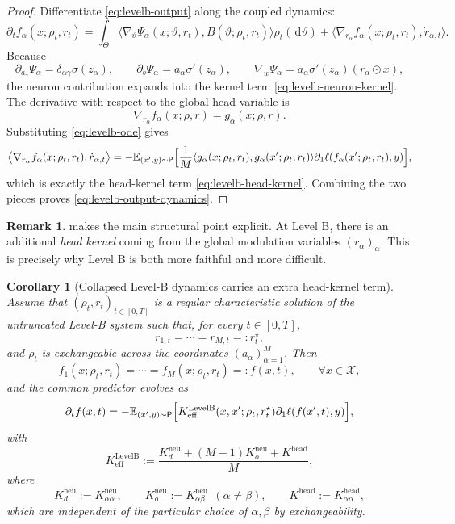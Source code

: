 \documentclass[11pt]{article}
\newtheorem{corollary}[theorem]{Corollary}
\theoremstyle{definition}
\newtheorem{remark}[theorem]{Remark}
\newcommand{\E}{\mathbb{E}}
\newcommand{\dd}{\,\mathrm{d}}
\begin{document}
\begin{proof}
Differentiate \eqref{eq:levelb-output} along the coupled dynamics:
\[
  \partial_t f_\alpha(x;\rho_t,r_t)
  =
  \int_\Theta
  \langle \nabla_\vartheta \Psi_\alpha(x;\vartheta,r_t),
  B(\vartheta;\rho_t,r_t)\rangle
  \rho_t(\dd \vartheta)
  +
  \bigl\langle \nabla_{r_\alpha}f_\alpha(x;\rho_t,r_t),\dot r_{\alpha,t}\bigr\rangle.
\]
Because
\[
  \partial_{a_\gamma}\Psi_\alpha
  =
  \delta_{\alpha\gamma}\sigma(z_\alpha),
  \qquad
  \partial_b\Psi_\alpha
  =
  a_\alpha \sigma'(z_\alpha),
  \qquad
  \nabla_w\Psi_\alpha
  =
  a_\alpha \sigma'(z_\alpha)(r_\alpha\odot x),
\]
the neuron contribution expands into the kernel term \eqref{eq:levelb-neuron-kernel}.
The derivative with respect to the global head variable is
\[
  \nabla_{r_\alpha}f_\alpha(x;\rho,r)=g_\alpha(x;\rho,r).
\]
Substituting \eqref{eq:levelb-ode} gives
\[
  \bigl\langle \nabla_{r_\alpha}f_\alpha(x;\rho_t,r_t),\dot r_{\alpha,t}\bigr\rangle
  =
  -\E_{(x',y)\sim\mathsf P}
  \Bigl[
    \frac1M
    \langle g_\alpha(x;\rho_t,r_t),g_\alpha(x';\rho_t,r_t)\rangle
    \partial_1\ell(f_\alpha(x';\rho_t,r_t),y)
  \Bigr],
 \]
which is exactly the head-kernel term \eqref{eq:levelb-head-kernel}.
Combining the two pieces proves \eqref{eq:levelb-output-dynamics}.
\end{proof}

\begin{remark}
 makes the main structural point explicit.
At Level B, there is an additional \emph{head kernel} coming from the global modulation variables $(r_\alpha)_\alpha$.
This is precisely why Level B is both more faithful and more difficult.
\end{remark}

\begin{corollary}[Collapsed Level-B dynamics carries an extra head-kernel term]
\label{cor:levelb-collapsed}
Assume that $(\rho_t,r_t)_{t\in[0,T]}$ is a regular characteristic solution of the untruncated Level-B system such that, for every $t\in[0,T]$,
\[
  r_{1,t}=\cdots=r_{M,t}=:r_t^\star,
\]
and $\rho_t$ is exchangeable across the coordinates $(a_\alpha)_{\alpha=1}^M$.
Then
\[
  f_1(x;\rho_t,r_t)=\cdots=f_M(x;\rho_t,r_t)=:f(x,t),
  \qquad
  \forall x\in\mathcal X,
\]
and the common predictor evolves as
\begin{equation}
  \partial_t f(x,t)
  =
  -\E_{(x',y)\sim\mathsf P}
  \Bigl[
    K_{\mathrm{eff}}^{\mathrm{LevelB}}(x,x';\rho_t,r_t^\star)
    \partial_1\ell(f(x',t),y)
  \Bigr],
  \label{eq:levelb-keff-dynamics}
\end{equation}
with
\begin{equation}
  K_{\mathrm{eff}}^{\mathrm{LevelB}}
  :=
  \frac{
    K_d^{\mathrm{neu}}
    +(M-1)K_o^{\mathrm{neu}}
    +K^{\mathrm{head}}
  }{M},
  \label{eq:levelb-keff}
\end{equation}
where
\[
  K_d^{\mathrm{neu}}
  :=
  K_{\alpha\alpha}^{\mathrm{neu}},
  \qquad
  K_o^{\mathrm{neu}}
  :=
  K_{\alpha\beta}^{\mathrm{neu}}
  \ \ (\alpha\neq\beta),
  \qquad
  K^{\mathrm{head}}
  :=
  K_{\alpha\alpha}^{\mathrm{head}},
\]
which are independent of the particular choice of $\alpha,\beta$ by exchangeability.
\end{corollary}
\end{document}
